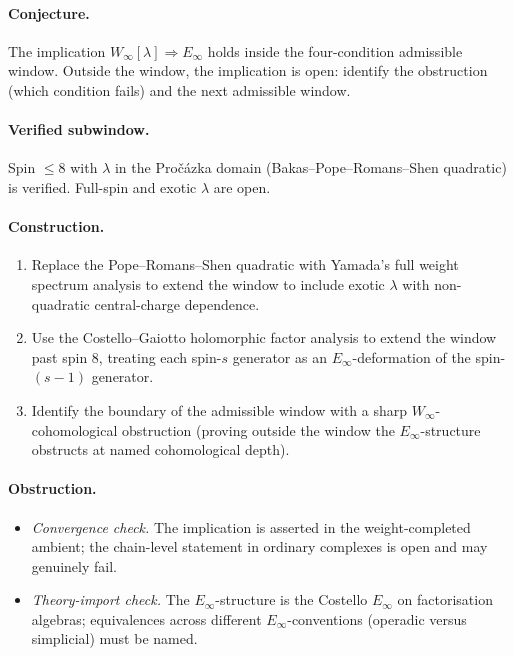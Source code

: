 \paragraph{Conjecture.} The implication
$W_\infty[\lambda] \Rightarrow E_\infty$ holds inside the four-condition
admissible window. Outside the window, the implication is open: identify
the obstruction (which condition fails) and the next admissible window.

\paragraph{Verified subwindow.} Spin $\leq 8$ with $\lambda$ in the
Pro\v{c}\'azka domain (Bakas--Pope--Romans--Shen quadratic) is verified.
Full-spin and exotic $\lambda$ are open.

\paragraph{Construction.}
\begin{enumerate}[nosep]
\item Replace the Pope--Romans--Shen quadratic with Yamada's full
  weight spectrum analysis to extend the window to include exotic
  $\lambda$ with non-quadratic central-charge dependence.
\item Use the Costello--Gaiotto holomorphic factor analysis to extend
  the window past spin $8$, treating each spin-$s$ generator as an
  $E_\infty$-deformation of the spin-$(s-1)$ generator.
\item Identify the boundary of the admissible window with a sharp
  $W_\infty$-cohomological obstruction (proving outside the window the
  $E_\infty$-structure obstructs at named cohomological depth).
\end{enumerate}

\paragraph{Obstruction.}
\begin{itemize}[nosep]
\item \emph{Convergence check.} The implication is asserted in the
  weight-completed ambient; the chain-level statement in ordinary
  complexes is open and may genuinely fail.
\item \emph{Theory-import check.} The $E_\infty$-structure is the
  Costello $E_\infty$ on factorisation algebras; equivalences across
  different $E_\infty$-conventions (operadic versus simplicial) must be
  named.
\end{itemize}

